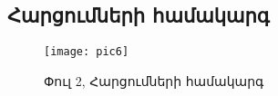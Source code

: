{
    \subsection{Հարցումների համակարգ}\label{subsec:queries}

    \begin{figure}[h]
        \centering
        \texttt{[image: pic6]}
        \caption{Փուլ 2, Հարցումների համակարգ}
        \label{fig:figure6}
    \end{figure}

    
}